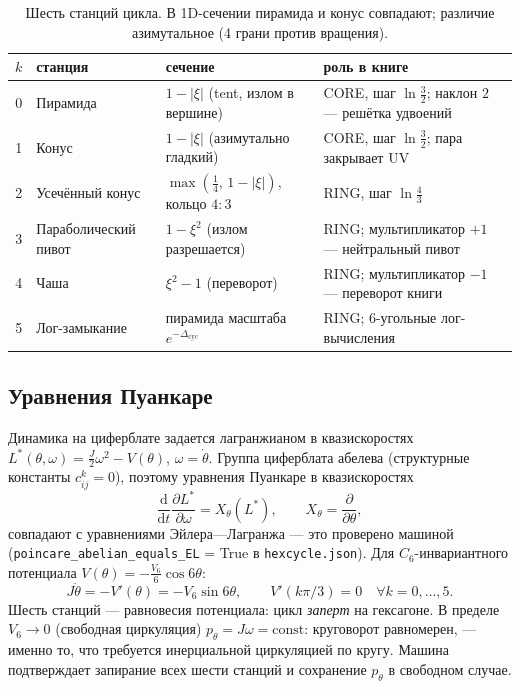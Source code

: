 \documentclass[11pt,a4paper]{article}
\newcommand{\dd}{\mathrm{d}}
\newcommand{\Dcy}{\Delta_{\mathrm{cyc}}}
\begin{document}
\begin{table}[h]
\centering\small
{}
\begin{tabularx}{\textwidth}{c l Y Y}
\toprule
$k$ & станция & сечение & роль в книге \\
 & Пирамида & $1-|\xi|$ (tent, излом в вершине) & CORE, шаг $\ln\frac32$; наклон $2$ --- решётка удвоений \\
1 & Конус & $1-|\xi|$ (азимутально гладкий) & CORE, шаг $\ln\frac32$; пара закрывает UV \\
2 & Усечённый конус & $\max(\frac14,\, 1-|\xi|)$, кольцо $4{:}3$ & RING, шаг $\ln\frac43$ \\
3 & Параболический пивот & $1-\xi^2$ (излом разрешается) & RING; мультипликатор $+1$ --- нейтральный пивот \\
4 & Чаша & $\xi^2-1$ (переворот) & RING; мультипликатор $-1$ --- переворот книги \\
5 & Лог-замыкание & пирамида масштаба $e^{-\Dcy}$ & RING; 6-угольные лог-вычисления \\
\bottomrule
\end{tabularx}
\caption{Шесть станций цикла. В 1D-сечении пирамида и конус совпадают;
различие азимутальное (4 грани против вращения).}
\end{table}

\subsection{Уравнения Пуанкаре}

Динамика на циферблате задается лагранжианом в квазискоростях
$L^*(\theta, \omega) = \frac{J}{2}\omega^2 - V(\theta)$, $\omega = \dot\theta$.
Группа циферблата абелева (структурные константы $c^k_{ij} = 0$), поэтому
уравнения Пуанкаре в квазискоростях
\begin{equation}
\frac{\dd}{\dd t}\frac{\partial L^*}{\partial \omega} = X_\theta(L^*),
\qquad X_\theta = \frac{\partial}{\partial \theta},
\end{equation}
совпадают с уравнениями Эйлера---Лагранжа --- это проверено машиной
(\texttt{poincare\_abelian\_\allowbreak equals\_\allowbreak EL} = True в \texttt{hexcycle.json}).
Для $C_6$-инвариантного потенциала $V(\theta) = -\frac{V_6}{6}\cos 6\theta$:
\begin{equation}
J\ddot\theta = -V'(\theta) = -V_6 \sin 6\theta, \qquad
V'(k\pi/3) = 0 \quad \forall k = 0,\dots,5.
\end{equation}
Шесть станций --- равновесия потенциала: цикл \emph{заперт} на гексагоне.
В пределе $V_6 \to 0$ (свободная циркуляция) $p_\theta = J\omega = \text{const}$:
круговорот равномерен, --- именно то, что требуется инерциальной циркуляцией
по кругу. Машина подтверждает запирание всех шести станций и сохранение
$p_\theta$ в свободном случае.
\end{document}
